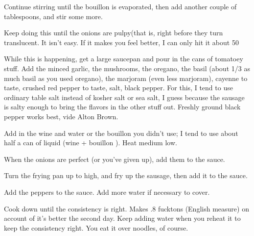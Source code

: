 Continue stirring until the bouillon is evaporated, then add another couple
of tablespoons, and stir some more.

Keep doing this until the onions are pulpy(that is, right before they turn
translucent. It isn't easy. If it makes you feel better, I can only hit it
about 50%

While this is happening, get a large saucepan and pour in the cans of
tomatoey stuff. Add the minced garlic, the mushrooms, the oregano, the
basil (about 1/3 as much basil as you used oregano), the marjoram (even
less marjoram), cayenne to taste, crushed red pepper to taste, salt, black
pepper. For this, I tend to use ordinary table salt instead of kosher salt
or sea salt, I guess because the sausage is salty enough to bring the
flavors in the other stuff out. Freshly ground black pepper works best,
vide Alton Brown.

Add in the wine and water or the bouillon you didn't use; I tend to use
about half a can of liquid (wine + bouillon ). Heat medium low.

When the onions are perfect (or you've given up), add them to the sauce.

Turn the frying pan up to high, and fry up the sausage, then add it to the
sauce.

Add the peppers to the sauce. Add more water if necessary to cover.

Cook down until the consistency is right. Makes .8 fucktons (English
measure) on account of it's better the second day. Keep adding water when
you reheat it to keep the consistency right. You eat it over noodles, of
course.
